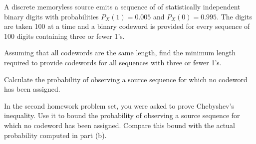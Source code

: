 \documentclass[a4paper,10pt,landscape,twocolumn]{scrartcl}
\begin{document}
\begin{exercise}
A discrete memoryless source emits a sequence of of statistically independent binary digits with probabilities $P_X(1) = 0.005$ and $P_X(0) = 0.995$. The digits are taken 100 at a time and a binary codeword is provided for every sequence of 100 digits containing three or fewer 1's.
	\begin{subex}
	Assuming that all codewords are the same length, find the minimum length required to
provide codewords for all sequences with three or fewer 1's.
	\end{subex}
	\begin{subex}
	Calculate the probability of observing a source sequence for which no codeword has
been assigned.
	\end{subex}
	\begin{subex}
	In the second homework problem set, you were asked to prove Chebyshev's inequality.
	Use it to bound the probability of observing a source sequence for
which no codeword has been assigned. Compare this bound with the actual probability computed
in part (b).
	\end{subex}
\end{exercise}
\end{document}
